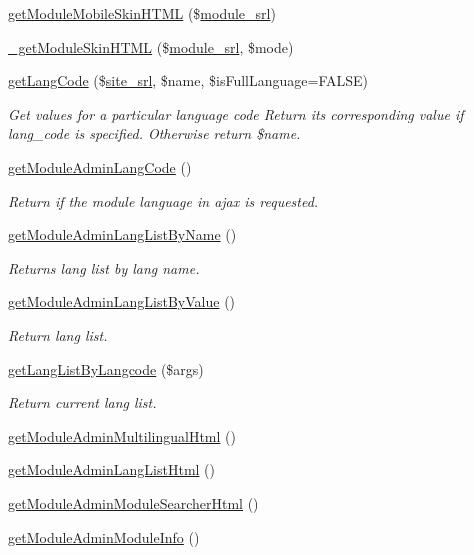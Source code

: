 \begin{DoxyCompactItemize}
\hyperlink{classmoduleAdminModel_a38c85d9c28facff15f1c54ebe1e5b70b}{get\+Module\+Mobile\+Skin\+H\+T\+M\+L} (\$\hyperlink{ko_8install_8php_a370bb6450fab1da3e0ed9f484a38b761}{module\+\_\+srl})
\item 
\hyperlink{classmoduleAdminModel_ac69c4e024dcabbcaa3f7a13a4c61af04}{\+\_\+get\+Module\+Skin\+H\+T\+M\+L} (\$\hyperlink{ko_8install_8php_a370bb6450fab1da3e0ed9f484a38b761}{module\+\_\+srl}, \$mode)
\item 
\hyperlink{classmoduleAdminModel_aa10dc8b8645165816c43f140c57b546b}{get\+Lang\+Code} (\$\hyperlink{ko_8install_8php_a8b1406b4ad1048041558dce6bfe89004}{site\+\_\+srl}, \$name, \$is\+Full\+Language=F\+A\+L\+S\+E)
\begin{DoxyCompactList}\small\item\em Get values for a particular language code Return its corresponding value if lang\+\_\+code is specified. Otherwise return \$name. \end{DoxyCompactList}\item 
\hyperlink{classmoduleAdminModel_a783b7e9e5a0db68d0eb782fff6f7e461}{get\+Module\+Admin\+Lang\+Code} ()
\begin{DoxyCompactList}\small\item\em Return if the module language in ajax is requested. \end{DoxyCompactList}\item 
\hyperlink{classmoduleAdminModel_ab5982d758fb39c6d56c41af9827845cf}{get\+Module\+Admin\+Lang\+List\+By\+Name} ()
\begin{DoxyCompactList}\small\item\em Returns lang list by lang name. \end{DoxyCompactList}\item 
\hyperlink{classmoduleAdminModel_acd8e42367271f853d4da4388fe15b0d1}{get\+Module\+Admin\+Lang\+List\+By\+Value} ()
\begin{DoxyCompactList}\small\item\em Return lang list. \end{DoxyCompactList}\item 
\hyperlink{classmoduleAdminModel_a425b28af6d0f27c2306191d7a4abdbaa}{get\+Lang\+List\+By\+Langcode} (\$args)
\begin{DoxyCompactList}\small\item\em Return current lang list. \end{DoxyCompactList}\item 
\hyperlink{classmoduleAdminModel_a51568f16c761da74a811fe599970ea0f}{get\+Module\+Admin\+Multilingual\+Html} ()
\item 
\hyperlink{classmoduleAdminModel_a1f3f518448a54604d56032927b4ef957}{get\+Module\+Admin\+Lang\+List\+Html} ()
\item 
\hyperlink{classmoduleAdminModel_aca064d49155437d5cad912d1f885933f}{get\+Module\+Admin\+Module\+Searcher\+Html} ()
\item 
\hyperlink{classmoduleAdminModel_a205c97c3919ee573047431c8c2a0e1a7}{get\+Module\+Admin\+Module\+Info} ()
\end{DoxyCompactItemize}
